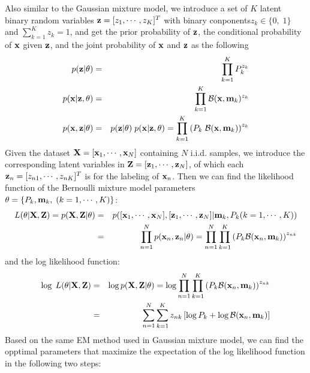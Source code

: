 \documentclass{article}
\begin{document}
Also similar to the Gaussian mixture model, we introduce a set of $K$
latent binary random variables ${\bf z}=[z_1,\cdots,z_K]^T$ with binary 
conponents$z_k\in\{0,\;1\}$ and $\sum_{k=1}^K z_k=1$, and get the prior 
probability of ${\bf z}$, the conditional probability of ${\bf x}$ given 
${\bf z}$, and the joint probability of ${\bf x}$ and ${\bf z}$ as the
following
\begin{eqnarray}
  p({\bf z}|{\bf\theta})&=&\prod_{k=1}^KP_k^{z_k}  \\
  p({\bf x}|{\bf z},{\bf\theta})&=&\prod_{k=1}^K {\cal B}({\bf x},{\bf m}_k)^{z_k}  \\
  p({\bf x},{\bf z}|{\bf\theta})
  &=&p({\bf z}|{\bf\theta})\;p({\bf x}|{\bf z},{\bf\theta})
  =\prod_{k=1}^K \left(P_k\;{\cal B}({\bf x},{\bf m}_k)\right)^{z_k}
\end{eqnarray}
Given the dataset ${\bf X}=[{\bf x}_1,\cdots,{\bf x}_N]$ containing 
$N$ i.i.d. samples, we introduce the corresponding latent variables 
in ${\bf Z}=[{\bf z}_1,\cdots,{\bf z}_N]$, of which each 
${\bf z}_n=[z_{n1},\cdots,z_{nK}]^T$ is for the labeling of ${\bf x}_n$.
Then we can find the likelihood function of the Bernoulli mixture model
parameters ${\bf\theta}=\{P_k,{\bf m}_k,\;(k=1,\cdots,K)\}$:
\begin{eqnarray}
  L({\bf\theta}|{\bf X},{\bf Z})=p({\bf X},{\bf Z}|\theta)
  &=&p([{\bf x}_1,\cdots,{\bf x}_N],[{\bf z}_1,\cdots,{\bf z}_N]
  |{\bf m}_k,P_k(k=1,\cdots,K))
  \nonumber\\
  &=&\prod_{n=1}^N p({\bf x}_n,{\bf z}_n|{\bf\theta})
  =\prod_{n=1}^N \prod_{k=1}^K \left(P_k{\cal B}({\bf x}_n,{\bf m}_k)\right)^{z_{nk}}
\end{eqnarray}
and the log likelihood function:
\begin{eqnarray}
  \log\;L({\bf\theta}|{\bf X},{\bf Z})&=&\log p({\bf X},{\bf Z}|\theta)
  =\log\prod_{n=1}^N \prod_{k=1}^K \left(P_k{\cal B}({\bf x}_n,{\bf m}_k)\right)^{z_{nk}}
  \nonumber\\
  &=&\sum_{n=1}^N \sum_{k=1}^K {z_{nk}} \left[ \log P_k
    +\log {\cal B}({\bf x}_n,{\bf m}_k)\right]
\end{eqnarray}
Based on the same EM method used in Gaussian mixture model, we can 
find the opptimal parameters that maximize the expectation of the
log likelihood function in the following two steps:
\end{document}
